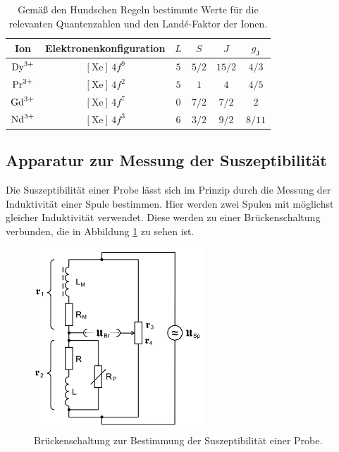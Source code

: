 \begin{table}[H]
\begin{center}
\caption{Gemäß den Hundschen Regeln bestimmte Werte für die relevanten Quantenzahlen und den Landé-Faktor der Ionen.}
\label{tab:lsjg}
\begin{tabular}{cccccc}
\toprule
Ion & Elektronenkonfiguration & $L$ & $S$ & $J$ & $g_{\text{J}}$\\
\midrule
$\ce{Dy^{3+}}$ & $[\text{Xe}] \, 4f^9$ & $5$ & $5/2$ & $15/2$ & $4/3$  \\
$\ce{Pr^{3+}}$ & $[\text{Xe}] \, 4f^2$ & $5$ & $1$   & $4$    & $4/5$  \\
$\ce{Gd^{3+}}$ & $[\text{Xe}] \, 4f^7$ & $0$ & $7/2$ & $7/2$  & $2$    \\
$\ce{Nd^{3+}}$ & $[\text{Xe}] \, 4f^3$ & $6$ & $3/2$ & $9/2$  & $8/11$ \\
\bottomrule
\end{tabular}
\end{center}
\end{table}

\subsection{Apparatur zur Messung der Suszeptibilität}
\label{subsec:apparatur}

Die Suszeptibilität einer Probe lässt sich im Prinzip durch die Messung
der Induktivität einer Spule bestimmen. Hier werden zwei Spulen mit möglichst gleicher
Induktivität verwendet. Diese werden zu einer Brückenschaltung verbunden, die in Abbildung
\ref{fig:brueckenschaltung} zu sehen ist.

\begin{figure}
  \centering
  \includegraphics[width=180pt]{data/bruecke.png}
  \caption{Brückenschaltung zur Bestimmung der Suszeptibilität einer Probe\cite{Versuchsanleitung}.}
  \label{fig:brueckenschaltung}
\end{figure}

